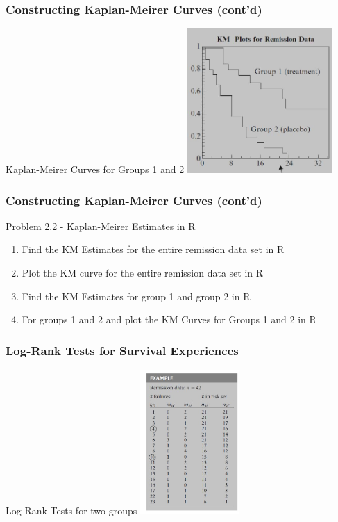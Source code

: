 \documentclass{beamer}
\theoremstyle{definition}
\begin{document}
\begin{frame}
\frametitle{Constructing Kaplan-Meirer Curves (cont'd)}
\begin{block}{Kaplan-Meirer Curves for Groups 1 and 2}
         \includegraphics[width =\textwidth, height=5.5cm]{Ch2_KM_GR12.JPG}
\end{block}
\end{frame}

\begin{frame}
\frametitle{Constructing Kaplan-Meirer Curves (cont'd)}
\begin{block}{Problem 2.2 - Kaplan-Meirer Estimates in R}
\begin{enumerate}
\item Find the KM Estimates for the entire remission data set in R
\item Plot the KM curve for the entire remission data set in R
\item Find the KM Estimates for group 1 and group 2 in R
\item For groups 1 and 2 and plot the KM Curves for Groups 1 and 2 in R
\end{enumerate}
\end{block}
\end{frame}

\begin{frame}
\frametitle{Log-Rank Tests for Survival Experiences}
\begin{block}{Log-Rank Tests for two groups}
\includegraphics[width =\textwidth, height=5.5cm]{CH2_LogRank.JPG}
\end{block}
\end{frame}
\end{document}
